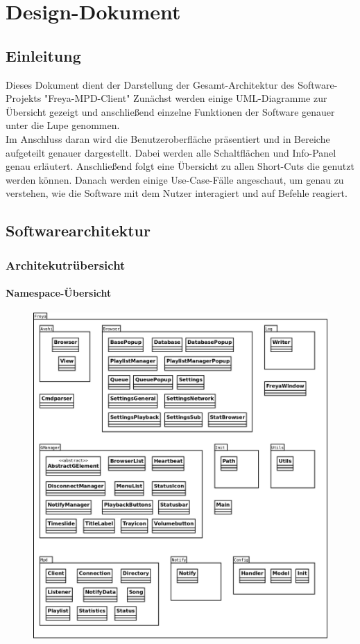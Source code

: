 \chapter{Design-Dokument}
\section{Einleitung}
Dieses Dokument dient der Darstellung der Gesamt-Architektur des Software-Projekts "Freya-MPD-Client"
Zunächst werden einige UML-Diagramme zur Übersicht gezeigt und anschließend einzelne Funktionen der
Software genauer unter die Lupe genommen.\ \\
Im Anschluss daran wird die Benutzeroberfläche präsentiert und in Bereiche aufgeteilt genauer dargestellt.
Dabei werden alle Schaltflächen und Info-Panel genau erläutert.
Anschließend folgt eine Übersicht zu allen Short-Cuts die genutzt werden können.
Danach werden einige Use-Case-Fälle angeschaut, um genau zu verstehen, wie die Software mit dem Nutzer
interagiert und auf Befehle reagiert.
\newpage
\section{Softwarearchitektur}
\subsection{Architekutrübersicht}
\subsubsection{Namespace-Übersicht}
\begin{figure}[h]
\centering
\includegraphics[scale=0.3]{Namespace_Uebersicht.png}
\end{figure}
\newpage
